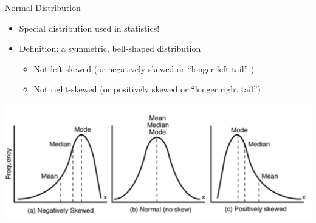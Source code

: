 \documentclass[
  8pt,
  ignorenonframetext,
  dvipsnames]{beamer}
\providecommand{\tightlist}{%
  \setlength{\itemsep}{0pt}\setlength{\parskip}{0pt}}
\let\olditem\item
\renewcommand{\item}{%
  \olditem\vspace{4pt}
}
\begin{document}
\begin{frame}{Normal Distribution}
\protect\hypertarget{normal-distribution}{}

\begin{itemize}
\tightlist
\item
  Special distribution used in statistics!
\end{itemize}

\medskip

\begin{itemize}
\tightlist
\item
  Definition: a symmetric, bell-shaped distribution

  \begin{itemize}
  \tightlist
  \item
    Not left-skewed (or negatively skewed or ``longer left tail'' )
  \item
    Not right-skewed (or positively skewed or ``longer right tail'')
  \end{itemize}
\end{itemize}

\medskip

\includegraphics{distributions.png}

\end{frame}
\end{document}
